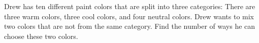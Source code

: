 Drew has ten different paint colors that are split into three categories: There are three warm colors, three cool colors, and four neutral colors. Drew wants to mix two colors that are not from the same category. Find the number of ways he can choose these two colors.
